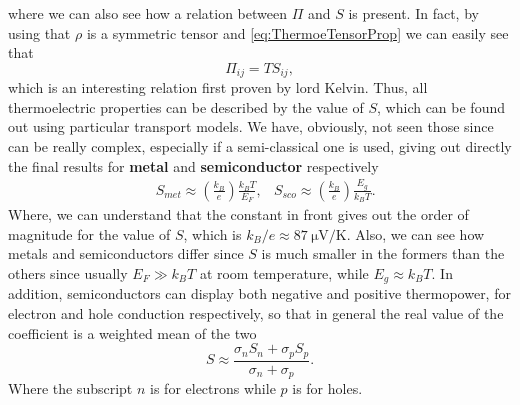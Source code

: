 where we can also see how a relation between $\Pi$ and $S$ is present. In fact, by using that $\rho$ is a symmetric tensor and \eqref{eq:ThermoeTensorProp} we can easily see that
\begin{equation}
    \Pi_{ij} = TS_{ij},
\end{equation}
which is an interesting relation first proven by lord Kelvin. Thus, all thermoelectric properties can be described by the value of $S$, which can be found out using particular transport models. We have, obviously, not seen those since can be really complex, especially if a semi-classical one is used, giving out directly the final results for \textbf{metal} and \textbf{semiconductor} respectively
\begin{align}
    &S_{met} \approx \left( \frac{k_B}{e} \right)\frac{k_BT}{E_F}, &S_{sco} \approx \left( \frac{k_B}{e} \right)\frac{E_g}{k_BT}.
\end{align}
Where, we can understand that the constant in front gives out the order of magnitude for the value of $S$, which is $k_B/e \approx \SI{87}{\micro\volt/\kelvin}$. Also, we can see how metals and semiconductors differ since $S$ is much smaller in the formers than the others since usually $E_F \gg k_BT$ at room temperature, while $E_g \approx k_BT$. In addition, semiconductors can display both negative and positive thermopower, for electron and hole conduction respectively, so that in general the real value of the coefficient is a weighted mean of the two
\begin{equation}
    S\approx \frac{\sigma_nS_n + \sigma_pS_p}{\sigma_n + \sigma_p}.
\end{equation}
Where the subscript $n$ is for electrons while $p$ is for holes.

